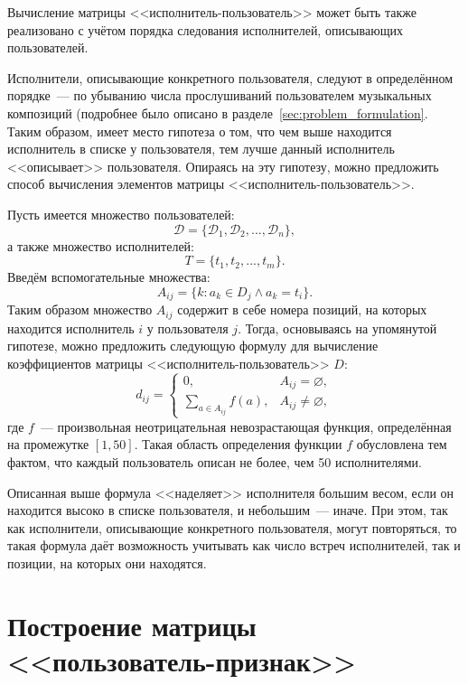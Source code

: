 Вычисление матрицы <<исполнитель-пользователь>> может быть
также реализовано с учётом порядка следования исполнителей,
описывающих пользователей. 

Исполнители, описывающие конкретного пользователя, следуют
в определённом порядке~--- по убыванию числа прослушиваний
пользователем музыкальных композиций (подробнее было описано
в разделе~\ref{sec:problem_formulation}. Таким образом,
имеет место гипотеза о том, что чем выше находится исполнитель
в списке у пользователя, тем лучше данный исполнитель
<<описывает>> пользователя. Опираясь на эту гипотезу, можно
предложить способ вычисления элементов матрицы
<<исполнитель-пользователь>>. 

Пусть имеется множество пользователей:
\[
    \mathcal{D} = \{\mathcal{D}_1, \mathcal{D}_2,..., \mathcal{D}_n\},
\]
а также множество исполнителей:
\[
    T = \{t_1, t_2,..., t_m\}.
\] 
Введём вспомогательные множества:
\[
    A_{ij} = \{k \colon a_k \in D_j \land a_k = t_i\}.
\]
Таким образом множество $A_{ij}$ содержит в себе номера
позиций, на которых находится исполнитель $i$ у
пользователя $j$. Тогда, основываясь на упомянутой гипотезе,
можно предложить следующую формулу для вычисление коэффициентов
матрицы <<исполнитель-пользователь>> $D$:
\begin{equation}\label{eq:order_dij}
    d_{ij} = \begin{cases}
          0,& A_{ij} = \varnothing,\\
          \sum\limits_{a \in A_{ij}}{f(a)},& A_{ij} \ne \varnothing,
      \end{cases}
\end{equation}
где $f$~--- произвольная неотрицательная невозрастающая функция,
определённая на промежутке $\left[1, 50\right]$. Такая область
определения функции $f$ обусловлена тем фактом, что каждый
пользователь описан не более, чем 50 исполнителями.

Описанная выше формула <<наделяет>> исполнителя большим
весом, если он находится высоко в списке пользователя, и
небольшим~--- иначе. При этом, так как исполнители,
описывающие конкретного пользователя, могут повторяться,
то такая формула даёт возможность учитывать как число
встреч исполнителей, так и позиции, на которых они находятся.

\section{Построение матрицы <<пользователь-признак>>}
\label{sec:step2_user_feature_matrix}


